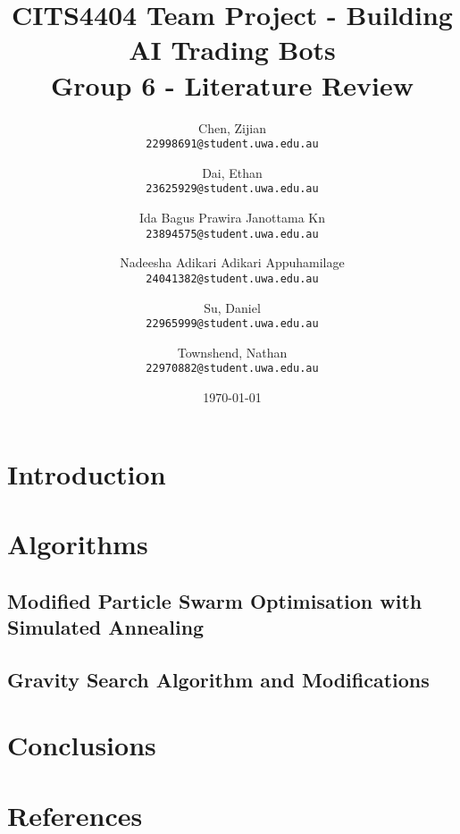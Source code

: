 \documentclass{article}
\title{
    CITS4404 Team Project - Building AI Trading Bots
    \\ \large Group 6 - Literature Review
}
\author{
    Chen, Zijian\\
    \texttt{22998691@student.uwa.edu.au}
    \and
    Dai, Ethan\\
    \texttt{23625929@student.uwa.edu.au}
    \and
    Ida Bagus Prawira Janottama Kn\\
    \texttt{23894575@student.uwa.edu.au}
    \and
    Nadeesha Adikari Adikari Appuhamilage\\
    \texttt{24041382@student.uwa.edu.au}
    \and
    Su, Daniel\\
    \texttt{22965999@student.uwa.edu.au}
    \and
    Townshend, Nathan\\
    \texttt{22970882@student.uwa.edu.au}
}
\date{\today}
\begin{document}
\clearpage

\maketitle


\newpage
\tableofcontents


\newpage
\section{Introduction}\label{sec:intro}
% 


\newpage
\section{Algorithms}\label{sec:alg}

\subsection{Modified Particle Swarm Optimisation with Simulated Annealing}\label{sec:alg:sa-pso}

\subsection{Gravity Search Algorithm and Modifications}\label{sec:alg:gsa}



\newpage
\section{Conclusions}\label{sec:conc}
% 


\newpage
{}
\section{References}
\vspace{-24pt}
\renewcommand{\refname}{}


\end{document}
